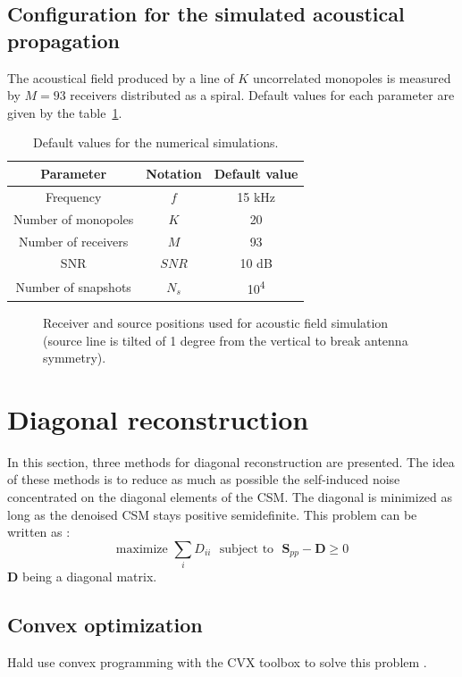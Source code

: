 \documentclass[fontsize=12pt,DIV13,paper=a4,abstract=true,titlepage=false]{scrartcl}
\newcommand{\bo}[1]{ \mathbf{#1} }
\begin{document}
\subsection{Configuration for the simulated acoustical propagation}
The acoustical field produced by a line of $K$ uncorrelated monopoles is measured by $M=93$ receivers  distributed as a spiral.
Default values for each parameter are given by the table~\ref{default_values}.
\begin{table}[H]
	\centering
	\begin{tabular}{c|c|c}
		\textbf{Parameter} & \textbf{Notation} & \textbf{Default value}\\\hline
		Frequency	&	$f$ 	&	15 kHz\\ \hline
		Number of monopoles	&	$K$	&	20\\ \hline
		Number of receivers	&	$M$ 	&	93\\ \hline
		SNR	&	$SNR$	&	10 dB\\ \hline
		Number of snapshots	&	$N_s$	&	10\textsuperscript{4}
	\end{tabular}
	\caption{Default values for the numerical simulations. \label{default_values}}

\end{table}

\begin{figure}[H]
	\centering
	
	\caption{Receiver and source positions used for acoustic field simulation (source line is tilted of 1 degree from the vertical to break antenna symmetry).}
\end{figure}


\section{Diagonal reconstruction}
In this section, three methods for diagonal reconstruction are presented. The idea of these methods is to reduce as much as possible the self-induced noise concentrated on the diagonal elements of the CSM. The diagonal is minimized as long as the denoised CSM stays positive semidefinite. This problem can be written as : 
\begin{equation}
    \text{maximize~} \sum_i D_{ii} \text{~~subject to~~} \bo{S}_{pp}-\bo{D}\geq 0
\end{equation}
$\bo{D}$ being a diagonal matrix.\\

 \subsection{Convex optimization}
 Hald use convex programming with the CVX toolbox \cite{cvx,Grant_cvx} to solve this problem \cite{Hald2017}.
\end{document}
